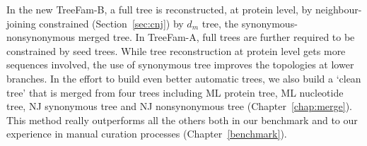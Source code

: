 In the new TreeFam-B, a full tree is reconstructed, at protein level, by neighbour-joining constrained (Section~\ref{sec:cnj})
by $d_m$ tree, the synonymous-nonsynonymous merged tree. In TreeFam-A, full trees are further required to be constrained by seed trees.
While tree reconstruction at protein level gets more sequences involved,
the use of synonymous tree improves the topologies at lower branches.
In the effort to build even better automatic trees, we also build a `clean tree' that is merged
from four trees including ML protein tree, ML nucleotide tree, NJ synonymous tree and
NJ nonsynonymous tree (Chapter~\ref{chap:merge}). This method really outperforms
all the others both in our benchmark and to our experience in manual curation processes (Chapter~\ref{benchmark}).
